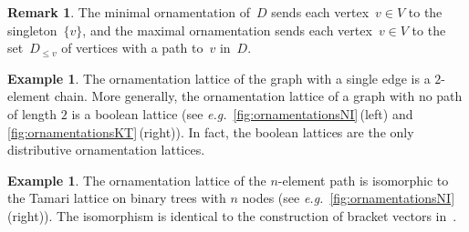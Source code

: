 \documentclass{amsart}
\theoremstyle{definition}
\newtheorem{example}[theorem]{Example}
\newtheorem{remark}[theorem]{Remark}
\renewcommand{\c}[1]{\mathcal{#1}} %
\newcommand{\ssm}{\smallsetminus} %
\newcommand{\eg}{\textit{e.g.}~} %
\newcommand{\lessin}[2]{#1_{\le#2}} %
\DeclareMathOperator{\Orn}{\c{O}}  %
\begin{document}
\begin{remark}
The minimal ornamentation of~$D$ sends each vertex~$v \in V$ to the singleton~$\{v\}$, and the maximal ornamentation sends each vertex~$v \in V$ to the set~$\lessin{D}{v}$ of vertices with a path to~$v$ in~$D$.
\end{remark}

\begin{example}
The ornamentation lattice of the graph with a single edge is a $2$-element chain.
More generally, the ornamentation lattice of a graph with no path of length $2$ is a boolean lattice (see \eg \cref{fig:ornamentationsNI}\,(left) and \ref{fig:ornamentationsKT}\,(right)).
In fact, the boolean lattices are the only distributive ornamentation lattices.
\end{example}

\begin{example}
The ornamentation lattice of the $n$-element path is isomorphic to the Tamari lattice on binary trees with $n$ nodes (see \eg \cref{fig:ornamentationsNI}\,(right)).
The isomorphism is identical to the construction of bracket vectors in~\cite{HuangTamari}.
\end{example}

\end{document}
